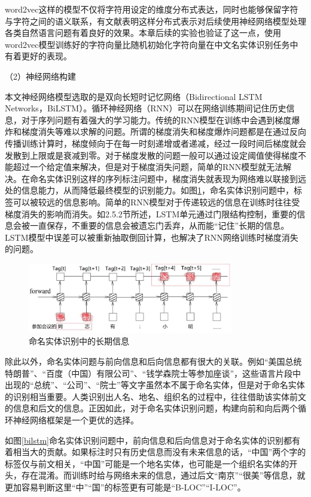 \documentclass[winfonts,master,oneside,nobackinfo]{njuthesis}
\begin{document}
word2vec这样的模型不仅将字符用设定的维度分布式表达，同时也能够保留字符与字符之间的语义联系，有文献\cite{Yoon}表明这样分布式表示对后续使用神经网络模型处理各类自然语言问题有着良好的效果。本章后续的实验也验证了这一点，使用word2vec模型训练好的字符向量比随机初始化字符向量在中文名实体识别任务中有着更好的表现。

（2）神经网络构建

本文神经网络模型选取的是双向长短时记忆网络（Bidirectional LSTM Networks，BiLSTM）。循环神经网络（RNN）可以在网络训练期间记住历史信息，对于序列问题有着强大的学习能力。传统的RNN模型在训练中会遇到梯度爆炸和梯度消失等难以求解的问题。所谓的梯度消失和梯度爆炸问题都是在通过反向传播训练计算时，梯度倾向于在每一时刻递增或者递减，经过一段时间后梯度就会发散到上限或是衰减到零。对于梯度发散的问题一般可以通过设定阈值使得梯度不能超过一个给定值来解决，但是对于梯度消失问题，简单的RNN模型就无法解决。在命名实体识别这样的序列标注问题中，梯度消失就表现为网络难以联接到远处的信息能力，从而降低最终模型的识别能力。如图\ref{simple_rnn}，命名实体识别问题中，标签可以被较远的信息影响。简单的RNN模型对于传递较远的信息在训练时往往受梯度消失的影响而消失。如2.5.2节所述，LSTM单元通过门限结构控制，重要的信息会被一直保存，不重要的信息会被遗忘门丢弃，从而能“记住”长期的信息。LSTM模型中误差可以被重新抽取倒回计算，也解决了RNN网络训练时梯度消失的问题。

\begin{figure}[h]
\centering
\includegraphics[width=0.8\textwidth]{./figure/命名实体识别长期信息.jpg}
\caption{命名实体识别中的长期信息}
\label{simple_rnn}
\end{figure}

除此以外，命名实体问题与前向信息和后向信息都有很大的关联。例如“美国总统特朗普”、“百度（中国）有限公司”、“钱学森院士等参加座谈”，这些语言片段中出现的“总统”、“公司”、“院士”等文字虽然本不属于命名实体，但是对于命名实体的识别相当重要。人类识别出人名、地名、组织名的过程中，往往借助该实体前文的信息和后文的信息。正因如此，对于命名实体识别问题，构建向前和向后两个循环神经网络框架是一个更优的选择。

如图\ref{bilstm}命名实体识别问题中，前向信息和后向信息对于命名实体的识别都有着相当大的贡献。如果标注时只有历史信息而没有未来信息的话，“中国”两个字的标签仅与前文相关，“中国”可能是一个地名实体，也可能是一个组织名实体的开头，存在混淆。而训练时给与网络未来的信息，通过后文“南京”“很美”等信息，就更加容易判断这里“中”“国”的标签更有可能是“B-LOC”“I-LOC”。
\end{document}
